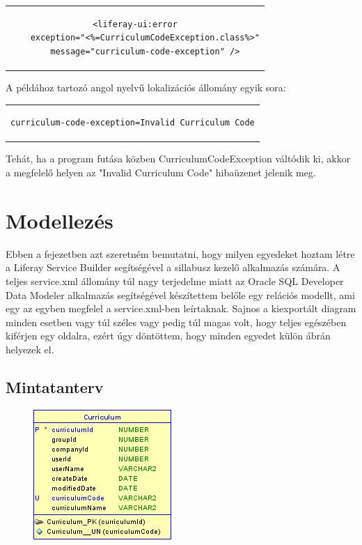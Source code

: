 \documentclass[hidelinks, 12pt, a4paper]{report}
\begin{document}
\begin{minipage}{\linewidth}
\begin{center}
\begin{tabular}{c}
\begin{lstlisting}
<liferay-ui:error
	exception="<%=CurriculumCodeException.class%>"
	message="curriculum-code-exception" />
\end{lstlisting}
\end{tabular}
\end{center}
\end{minipage}

\medskip
A példához tartozó angol nyelvű lokalizációs állomány egyik sora:

\begin{minipage}{\linewidth}
\begin{center}
\begin{tabular}{c}
\begin{lstlisting}
curriculum-code-exception=Invalid Curriculum Code
\end{lstlisting}
\end{tabular}
\end{center}
\end{minipage}

\medskip
Tehát, ha a program futása közben CurriculumCodeException váltódik ki, akkor a megfelelő helyen az "Invalid Curriculum Code" hibaüzenet jelenik meg.

\section{Modellezés}

Ebben a fejezetben azt szeretném bemutatni, hogy milyen egyedeket hoztam létre a Liferay Service Builder segítségével a sillabusz kezelő alkalmazás számára. A teljes service.xml állomány túl nagy terjedelme miatt az Oracle SQL Developer Data Modeler alkalmazás segítségével készítettem belőle egy relációs modellt, ami egy az egyben megfelel a service.xml-ben leírtaknak. Sajnos a kiexportált diagram minden esetben vagy túl széles vagy pedig túl magas volt, hogy teljes egészében kiférjen egy oldalra, ezért úgy döntöttem, hogy minden egyedet külön ábrán helyezek el.

\subsection{Mintatanterv}

\begin{figure}[H]
    \centering
	\includegraphics{curriculum.png}
\end{figure}
\end{document}
